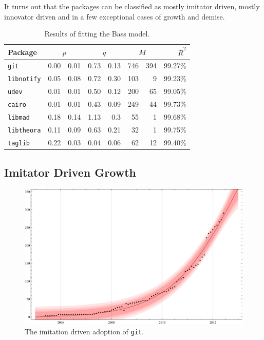\documentclass[smallextended,final]{svjour3}
\begin{document}
It turns out that the packages can be classified as mostly imitator driven, mostly innovator driven and in a few exceptional cases of growth and demise.

\begin{table}
\small\centering
\caption{Results of fitting the Bass model.}\label{tbl:results}
\begin{tabular}{lr@{ $\pm$}rr@{ $\pm$}rr@{ $\pm$}rr}
\toprule
Package & \multicolumn{2}{c}{$p$} & \multicolumn{2}{c}{$q$} & \multicolumn{2}{c}{$M$} & $\overline{R}^2$\\
\midrule
\texttt{git}         & 0.00 & 0.01    & 0.73 & 0.13   & 746 & 394 & 99.27\%\\
\texttt{libnotify}   & 0.05 & 0.08    & 0.72 & 0.30   & 103 &   9 & 99.23\%\\
\texttt{udev}        & 0.01 & 0.01    & 0.50 & 0.12   & 200 &  65 & 99.05\%\\
\texttt{cairo}       & 0.01 & 0.01    & 0.43 & 0.09   & 249 &  44 & 99.73\%\\
\texttt{libmad}      & 0.18 & 0.14    & 1.13 & 0.3    &  55 &   1 & 99.68\%\\
\texttt{libtheora}   & 0.11 & 0.09    & 0.63 & 0.21   &  32 &   1 & 99.75\%\\
\texttt{taglib}      & 0.22 & 0.03    & 0.04 & 0.06   &  62 &  12 & 99.40\%\\
\bottomrule
\end{tabular}
\end{table}

\subsection{Imitator Driven Growth}

\begin{figure}
\small\centering
\includegraphics[width=\linewidth]{BassFit-git2.pdf}
\caption{The imitation driven adoption of \texttt{git}.}\label{fig:git}
\vspace{-1em}
\end{figure}
\end{document}
